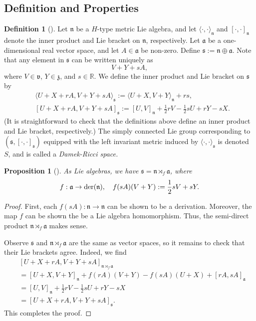 \documentclass{amsart}[]
\newcommand{\R}{\mathbb R}
\newcommand{\der}{\text{\normalfont der}}
\theoremstyle{plain}
\newtheorem{proposition}[theorem]{Proposition}
\theoremstyle{definition}
\newtheorem{definition}[theorem]{Definition}
\theoremstyle{remark}
\begin{document}
	\subsection{Definition and Properties}
	\begin{definition}[{\cite[Section 4.1.1]{tricerri}}]
		Let $\mathfrak n$ be a $H$-type metric Lie algebra, and let $\langle \cdot, \cdot \rangle_{\mathfrak n}$ and $[\cdot, \cdot]_{\mathfrak n}$ denote the inner product and Lie bracket on $\mathfrak n$, respectively. Let $\mathfrak a$ be a one-dimensional real vector space, and let $A \in \mathfrak a$ be non-zero. Define $\mathfrak s := \mathfrak n \oplus \mathfrak a$. Note that any element in $\mathfrak s$ can be written uniquely as 
		$$V + Y + sA,$$
		where $V \in \mathfrak v$, $Y \in \mathfrak z$, and $s \in \R$.
		We define the inner product and Lie bracket on $\mathfrak s$ by 
		\begin{align*}
			&\langle U + X + rA, V + Y + sA\rangle_{\mathfrak s} := \langle  U + X, V + Y\rangle_{\mathfrak n} + rs, \\
			&[U + X + rA, V + Y + sA]_{\mathfrak s} := [U,V]_{\mathfrak n} + \frac12 rV - \frac12 sU + rY - sX. 
		\end{align*}
		(It is straightforward to check that the definitions above define an inner product and Lie bracket, respectively.)
		The simply connected Lie group corresponding to $(\mathfrak s, [\cdot,\cdot]_{\mathfrak s})$ equipped with the  left invariant metric induced by $\langle\cdot ,\cdot \rangle_{\mathfrak s}$ is denoted $S$, and is called a \emph{Damek-Ricci space.}
	\end{definition}
	

	\begin{proposition}[{\cite[Section 4.1.3]{tricerri}}]
		As Lie algebras, we have $\mathfrak s = \mathfrak n \rtimes_f \mathfrak a$, where 
		$$f: \mathfrak a \rightarrow \der(\mathfrak n), \quad f(sA)(V+Y) := \frac12 s V + sY.$$
	\end{proposition}
	\begin{proof}
		First, each $f(sA):\mathfrak n \rightarrow \mathfrak n$ can be shown to be a derivation. Moreover, the map $f$ can be shown the be a Lie algebra homomorphism. Thus, the semi-direct product $\mathfrak n \rtimes_f \mathfrak a$ makes sense.
		
		Observe $\mathfrak s$ and $\mathfrak n \rtimes_f \mathfrak a$ are the same as vector spaces, so it remains to check that their Lie brackets agree.
		Indeed, we find
		\begin{align*}
			&[U+X+rA, V + Y+sA]_{ \mathfrak n \rtimes_f \mathfrak a} \\
			&= [U+X,V+Y]_{\mathfrak n} + f(rA)(V+Y) - f(sA)(U+X) + [rA,sA]_{\mathfrak a} 
			\\
			&= [U,V]_{\mathfrak n} + \frac12 rV - \frac12 sU + rY - sX \\
			&= [U + X + rA, V + Y + sA]_{\mathfrak s}.
		\end{align*}
		This completes the proof.
	\end{proof}
	
\end{document}
